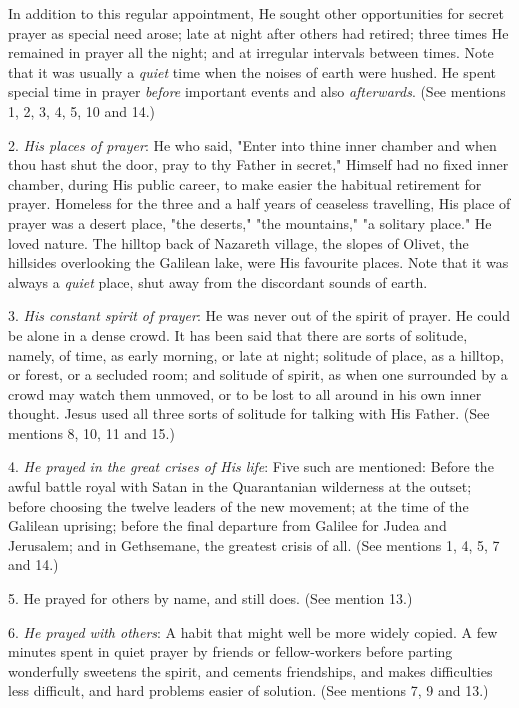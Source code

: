 In addition to this regular appointment, He sought other opportunities for
secret prayer as special need arose; late at night after others had
retired; three times He remained in prayer all the night; and at irregular
intervals between times. Note that it was usually a \textit{quiet} time when the
noises of earth were hushed. He spent special time in prayer \textit{before}
important events and also \textit{afterwards}. (See mentions 1, 2, 3, 4, 5, 10
and 14.)

2. \textit{His places of prayer}: He who said, "Enter into thine inner chamber
and when thou hast shut the door, pray to thy Father in secret," Himself
had no fixed inner chamber, during His public career, to make easier the
habitual retirement for prayer. Homeless for the three and a half years of
ceaseless travelling, His place of prayer was a desert place, "the
deserts," "the mountains," "a solitary place." He loved nature. The
hilltop back of Nazareth village, the slopes of Olivet, the hillsides
overlooking the Galilean lake, were His favourite places. Note that it was
always a \textit{quiet} place, shut away from the discordant sounds of earth.

3. \textit{His constant spirit of prayer}: He was never out of the spirit of
prayer. He could be alone in a dense crowd. It has been said that there
are sorts of solitude, namely, of time, as early morning, or late at
night; solitude of place, as a hilltop, or forest, or a secluded room; and
solitude of spirit, as when one surrounded by a crowd may watch them
unmoved, or to be lost to all around in his own inner thought. Jesus used
all three sorts of solitude for talking with His Father. (See mentions 8,
10, 11 and 15.)

4. \textit{He prayed in the great crises of His life}: Five such are mentioned:
Before the awful battle royal with Satan in the Quarantanian wilderness at
the outset; before choosing the twelve leaders of the new movement; at the
time of the Galilean uprising; before the final departure from Galilee for
Judea and Jerusalem; and in Gethsemane, the greatest crisis of all. (See
mentions 1, 4, 5, 7 and 14.)

5. He prayed for others by name, and still does. (See mention 13.)

6. \textit{He prayed with others}: A habit that might well be more widely copied.
A few minutes spent in quiet prayer by friends or fellow-workers before
parting wonderfully sweetens the spirit, and cements friendships, and
makes difficulties less difficult, and hard problems easier of solution.
(See mentions 7, 9 and 13.)

